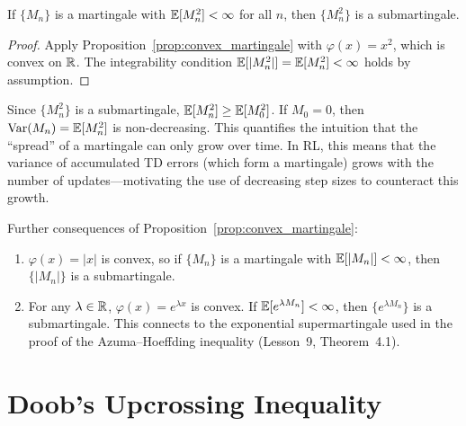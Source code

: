\documentclass[11pt,a4paper]{article}
\begin{document}
\begin{corollary}
\label{cor:squared_submartingale}
If $\{M_n\}$ is a martingale with $\mathbb{E}[M_n^2] < \infty$ for all
$n$, then $\{M_n^2\}$ is a submartingale.
\end{corollary}

\begin{proof}
Apply Proposition~\ref{prop:convex_martingale} with
$\varphi(x) = x^2$, which is convex on $\mathbb{R}$.  The integrability
condition $\mathbb{E}[|M_n^2|] = \mathbb{E}[M_n^2] < \infty$ holds by
assumption.
\end{proof}

\begin{remark}
\label{rem:squared_variance}
Since $\{M_n^2\}$ is a submartingale,
$\mathbb{E}[M_n^2] \geq \mathbb{E}[M_0^2]$.  If $M_0 = 0$, then
$\operatorname{Var}(M_n) = \mathbb{E}[M_n^2]$ is non-decreasing.  This quantifies the
intuition that the ``spread'' of a martingale can only grow over
time.  In RL, this means that the variance of accumulated TD
errors (which form a martingale) grows with the number of
updates---motivating the use of decreasing step sizes to
counteract this growth.
\end{remark}

\begin{example}
\label{ex:other_convex}
Further consequences of
Proposition~\ref{prop:convex_martingale}:
\begin{enumerate}[nosep]
  \item $\varphi(x) = |x|$ is convex, so if $\{M_n\}$ is a
    martingale with $\mathbb{E}[|M_n|] < \infty$, then $\{|M_n|\}$ is a
    submartingale.
  \item For any $\lambda \in \mathbb{R}$, $\varphi(x) = e^{\lambda x}$
    is convex.  If $\mathbb{E}[e^{\lambda M_n}] < \infty$, then
    $\{e^{\lambda M_n}\}$ is a submartingale.  This connects to
    the exponential supermartingale used in the proof of the
    Azuma--Hoeffding inequality (Lesson~9, Theorem~4.1).
\end{enumerate}
\end{example}


\section{Doob's Upcrossing Inequality}
\label{sec:upcrossing}
\end{document}
